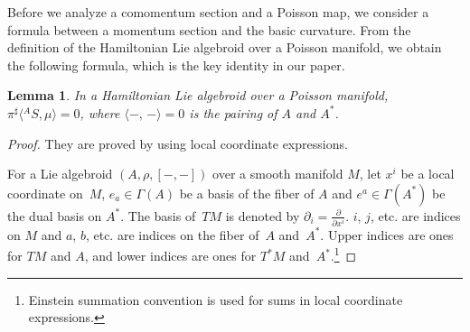 \documentclass[pdftex]{sigma}
\numberwithin{equation}{section}
\newtheorem{Lemma}[Theorem]{Lemma}
\newcommand{\bracket}[2]{\langle #1,\,#2\rangle}
\begin{document}
Before we analyze a comomentum section and a Poisson map,
we consider a formula between a momentum section and the basic curvature.
From the definition of the Hamiltonian Lie algebroid over a Poisson manifold,
we obtain the following formula, which is the key identity in our paper.
\begin{Lemma}\label{basicms}
In a Hamiltonian Lie algebroid over a Poisson manifold,
$\pi^{\sharp} \bigl\langle{}^A S,\mu\bigr\rangle =0$,
where $\bracket{-}{-} =0$ is the pairing of $A$ and $A^*$.
\end{Lemma}
\begin{proof}
They are proved by using local coordinate expressions.

For a Lie algebroid $(A, \rho, [-,-])$ over a smooth manifold $M$,
let $x^i$ be a local coordinate on~$M$, $e_a \in \Gamma(A)$ be a basis of the fiber of $A$ and $e^a \in \Gamma(A^*)$ be the dual basis on $A^*$.
The basis of~$TM$ is denoted by $\partial_i = \tfrac{\partial}{\partial x^i}$.
$i$, $j$, etc. are indices on $M$ and $a$, $b$, etc. are indices on
the fiber of~$A$ and~$A^*$.
Upper indices are ones for $TM$ and $A$, and lower indices are ones
for $T^*M$ and~$A^*$.\footnote{Einstein summation convention is used for
sums in local coordinate expressions.}


\end{proof}
\end{document}
